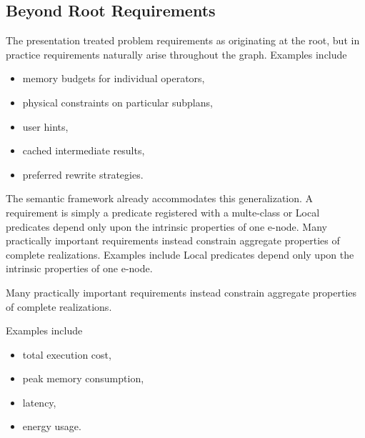 \documentclass[sigconf,nonacm]{acmart}
\theoremstyle{definition}
\theoremstyle{plain}
\theoremstyle{remark}
\begin{document}
\subsection{Beyond Root Requirements}

The presentation treated problem requirements as originating at the
root, but in practice requirements naturally arise throughout the
graph.  Examples include

\begin{itemize}

\item memory budgets for individual operators,

\item physical constraints on particular subplans,

\item user hints,

\item cached intermediate results,

\item preferred rewrite strategies.

\end{itemize}

The semantic framework already accommodates this generalization.  A
requirement is simply a predicate registered with a multe-class or
Local predicates depend only upon the intrinsic properties of one
e-node.  Many practically important requirements instead constrain
aggregate properties of complete realizations.  Examples include
Local predicates depend only upon the intrinsic properties of one
e-node.

Many practically important requirements instead constrain aggregate
properties of complete realizations.

Examples include

\begin{itemize}

\item total execution cost,

\item peak memory consumption,

\item latency,

\item energy usage.

\end{itemize}
\end{document}
